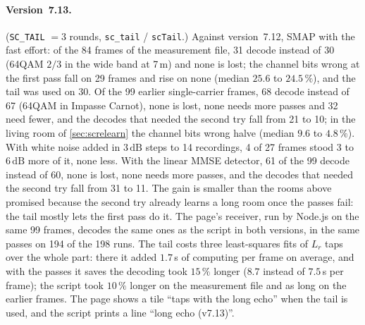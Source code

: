 \documentclass[11pt,a4paper]{article}
\newcommand{\dB}{\,\mathrm{dB}}
\newcommand{\code}[1]{\texttt{#1}}
\theoremstyle{remark}
\begin{document}
\paragraph{Version~7.13.} (\code{SC\_TAIL} $= 3$ rounds, \code{sc\_tail} / \code{scTail}.) Against version~7.12, SMAP with the fast effort: of the 84 frames of the measurement file, 31 decode instead of 30 (64QAM $2/3$ in the wide band at 7\,m) and none is lost; the channel bits wrong at the first pass fall on 29 frames and rise on none (median $25.6$ to $24.5\,\%$), and the tail was used on 30. Of the 99 earlier single-carrier frames, 68 decode instead of 67 (64QAM in Impasse Carnot), none is lost, none needs more passes and 32 need fewer, and the decodes that needed the second try fall from 21 to 10; in the living room of \cref{sec:screlearn} the channel bits wrong halve (median $9.6$ to $4.8\,\%$). With white noise added in $3\dB$ steps to 14 recordings, 4 of 27 frames stood 3 to $6\dB$ more of it, none less. With the linear MMSE detector, 61 of the 99 decode instead of 60, none is lost, none needs more passes, and the decodes that needed the second try fall from 31 to 11. The gain is smaller than the rooms above promised because the second try already learns a long room once the passes fail: the tail mostly lets the first pass do it. The page's receiver, run by Node.js on the same 99 frames, decodes the same ones as the script in both versions, in the same passes on 194 of the 198 runs. The tail costs three least-squares fits of $L_r$ taps over the whole part: there it added $1.7$\,s of computing per frame on average, and with the passes it saves the decoding took $15\,\%$ longer ($8.7$ instead of $7.5$\,s per frame); the script took $10\,\%$ longer on the measurement file and as long on the earlier frames. The page shows a tile ``taps with the long echo'' when the tail is used, and the script prints a line ``long echo (v7.13)''.
\end{document}
